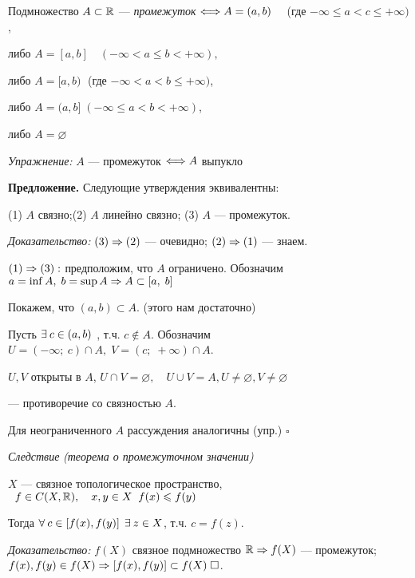 \documentclass[../../main.tex]{subfiles}
\begin{document}
 Подмножество $A \subset \mathbb{R}$ — \textit{промежуток} $\Longleftrightarrow A = (a, b) \quad $ (где $-\infty \leq a < c \leq +\infty)$, 

либо $A = [a, b] \quad (-\infty < a \leq b < +\infty), $ 

либо $A = [a, b)\; $ (где $-\infty < a < b \leq +\infty)$,

либо $A = (a, b] \; (-\infty \leq a < b < +\infty)$,

либо $A = \varnothing$

\textit{Упражнение:} $A$ — промежуток $\Longleftrightarrow A$ выпукло

\textbf{Предложение.} Следующие утверждения эквивалентны:

(1) $A$ связно;\quad (2) $A$ линейно связно; \quad (3) $A$ — промежуток.

\textit{Доказательство:} $(3) \Rightarrow (2)$ — очевидно; $(2) \Rightarrow (1)$ — знаем.

$(1) \Rightarrow (3):$ предположим, что $A$ ограничено. Обозначим $a = \inf A, \; b = \sup A \Rightarrow A \subset [a,\;b]$

Покажем, что $(a, b) \subset A$. (этого нам достаточно)

Пусть $\exists\: c \in (a, b)$ , т.ч. $c \notin A$. Обозначим $U = (-\infty;\: c) \cap A, \; V = (c;\; +\infty)\cap A$.
\vspace{7pt}

\begin{minipage}{0.7\linewidth}
$U, V$ открыты в $A$, $U \cap V = \varnothing,\quad U \cup V = A, U \neq \varnothing, V \neq \varnothing$

— противоречие со связностью $A$.

Для неограниченного $A$ рассуждения аналогичны (упр.) $\square$
\end{minipage}
\begin{minipage}{0.3\linewidth}
\end{minipage}
\vspace{7pt}

\textit{Следствие} \textit{(теорема о промежуточном значении)}

$X$ — связное топологическое пространство, $\;\; f \in C(X, \mathbb{R}), \quad x, y \in X \;\; f(x) \leqslant f(y)$

Тогда $\forall\: c \in \left[f(x), f(y)\right] \; \exists\: z \in X$, т.ч. $c = f(z)$.

\textit{Доказательство:} $f(X)$ связное подмножество $\mathbb{R} \Rightarrow f(X)$ — промежуток; $f(x), f(y) \in f(X) \Rightarrow \left[ f(x), f(y) \right] \subset f(X) \; \square$.
\end{document}
